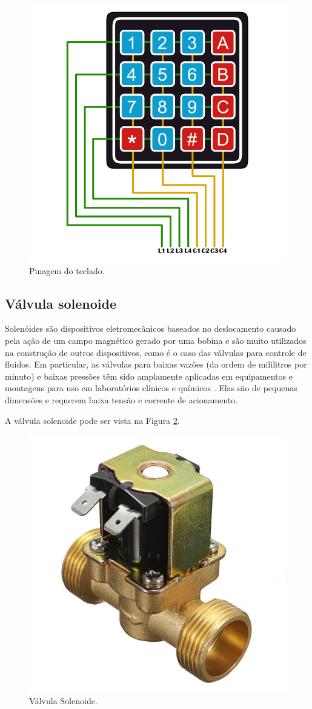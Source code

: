 \begin{figure}[htbp]
	\centering
	\includegraphics[scale=0.3]{figuras/keypad-1024x1024-pins.png}
	\caption{Pinagem do teclado.}
	\label{fig:teclado-pins}
\end{figure}

\newpage

\subsection{Válvula solenoide} \label{sec:valvula}

Solenóides são dispositivos eletromecânicos baseados no deslocamento causado pela ação de um campo magnético gerado por uma bobina e são muito utilizados na construção de outros dispositivos, como é o caso das válvulas para controle de fluidos. Em particular, as válvulas para baixas vazões (da ordem de mililitros por minuto) e baixas pressões têm sido amplamente aplicadas em equipamentos e montagens para uso em laboratórios clínicos e químicos  \cite{da2002modulo}. Elas são de pequenas dimensões e requerem baixa tensão e corrente de acionamento.

A válvula solenoide pode ser vista na Figura \ref{fig:valvula-solenoide}.

\begin{figure}[htbp]
	\centering
	\includegraphics[width=0.3\linewidth]{figuras/valvula-solenoide.jpg}
	\caption{Válvula Solenoide.}
	\label{fig:valvula-solenoide}
\end{figure}


